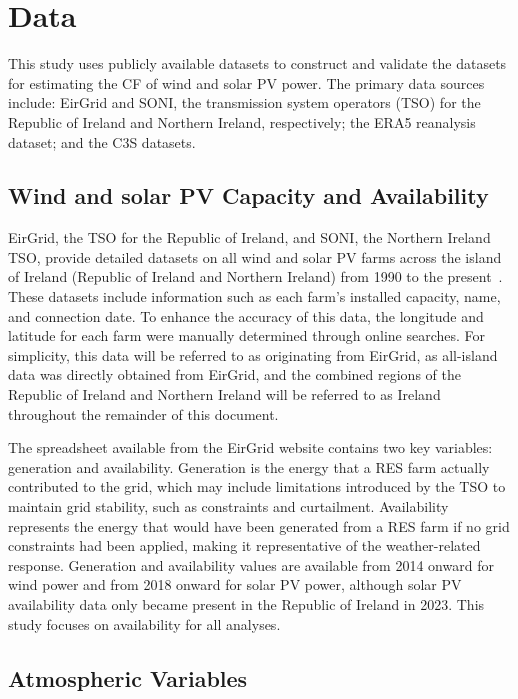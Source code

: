 \documentclass[preprint, 12pt]{elsarticle}
\begin{document}
\section{Data}
\label{sec:data}

This study uses publicly available datasets to construct and validate the datasets for estimating the CF of wind and solar PV power. The primary data sources include: EirGrid and SONI, the transmission system operators (TSO) for the Republic of Ireland and Northern Ireland, respectively; the ERA5 reanalysis dataset; and the C3S datasets.

\subsection{Wind and solar PV Capacity and Availability}
\label{sec:eirgrid}

EirGrid, the TSO for the Republic of Ireland, and SONI, the Northern Ireland TSO, provide detailed datasets on all wind and solar PV farms across the island of Ireland (Republic of Ireland and Northern Ireland) from 1990 to the present~\citep{eirgrid2023spreadsheet}. These datasets include information such as each farm’s installed capacity, name, and connection date. To enhance the accuracy of this data, the longitude and latitude for each farm were manually determined through online searches. For simplicity, this data will be referred to as originating from EirGrid, as all-island data was directly obtained from EirGrid, and the combined regions of the Republic of Ireland and Northern Ireland will be referred to as Ireland throughout the remainder of this document.

The spreadsheet available from the EirGrid website contains two key variables: generation and availability. Generation is the energy that a RES farm actually contributed to the grid, which may include limitations introduced by the TSO to maintain grid stability, such as constraints and curtailment. Availability represents the energy that would have been generated from a RES farm if no grid constraints had been applied, making it representative of the weather-related response. Generation and availability values are available from 2014 onward for wind power and from 2018 onward for solar PV power, although solar PV availability data only became present in the Republic of Ireland in 2023. This study focuses on availability for all analyses.

\subsection{Atmospheric Variables}
\label{sec:era5}
\end{document}
